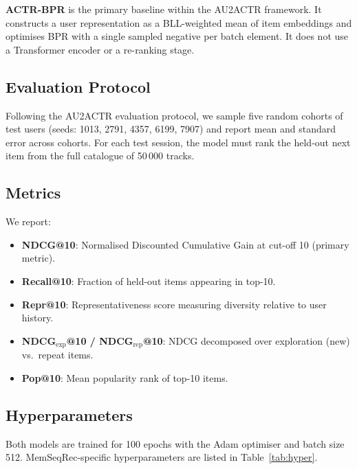\documentclass[conference]{IEEEtran}
\begin{document}
\textbf{ACTR-BPR} is the primary baseline within the AU2ACTR
framework.
It constructs a user representation as a BLL-weighted mean of item
embeddings and optimises BPR with a single sampled negative per
batch element.
It does not use a Transformer encoder or a re-ranking stage.

\subsection{Evaluation Protocol}
Following the AU2ACTR evaluation protocol, we sample five random
cohorts of test users (seeds: 1013, 2791, 4357, 6199, 7907) and
report mean and standard error across cohorts.
For each test session, the model must rank the held-out next item
from the full catalogue of 50\,000 tracks.

\subsection{Metrics}
We report:
\begin{itemize}
    \item \textbf{NDCG@10}: Normalised Discounted Cumulative Gain
          at cut-off 10 (primary metric).
    \item \textbf{Recall@10}: Fraction of held-out items appearing
          in top-10.
    \item \textbf{Repr@10}: Representativeness score measuring
          diversity relative to user history.
    \item \textbf{NDCG$_{\text{exp}}$@10 / NDCG$_{\text{rep}}$@10}:
          NDCG decomposed over exploration (new) vs.\ repeat items.
    \item \textbf{Pop@10}: Mean popularity rank of top-10 items.
\end{itemize}

\subsection{Hyperparameters}
Both models are trained for 100 epochs with the Adam optimiser
and batch size 512.
MemSeqRec-specific hyperparameters are listed in
Table~\ref{tab:hyper}.
\end{document}
